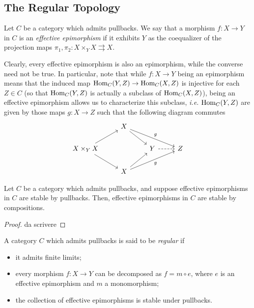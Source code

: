 \subsection{The Regular Topology}
\begin{defi}
	Let $C$ be a category which admits pullbacks. We say that a morphism $f:X\to Y$ in $C$ is an \textit{effective epimorphism} if it exhibits $Y$ as the coequalizer of the projection maps $\pi_1,\pi_2:X\times_Y X\rightrightarrows X$.
\end{defi}
\begin{rem}
	Clearly, every effective epimorphism is also an epimorphism, while the converse need not be true. In particular, note that while $f:X\to Y$ being an epimorphism means that the induced map $\mbox{Hom}_C(Y,Z)\to \mbox{Hom}_C(X,Z)$ is injective for each $Z\in C$ (so that $\mbox{Hom}_C(Y,Z)$ is actually a subclass of $\mbox{Hom}_C(X,Z)$), being an effective epimorphism allows us to characterize this subclass, \textit{i.e.} $\mbox{Hom}_C(Y,Z)$ are given by those maps $g:X\to Z$ such that the following diagram commutes
	\begin{equation*}
		\begin{tikzcd}
			& X \arrow[rd] \arrow[rrd, "g"]  &                     &   \\
			X\times_Y X \arrow[rd] \arrow[ru] &                                & Y \arrow[r, dashed] & Z \\
			& X \arrow[ru] \arrow[rru, "g"'] &                     &  
		\end{tikzcd}
	\end{equation*}
\end{rem}
\begin{lem}\label{Lemma:effectiveEpiComp}
	Let $C$ be a category which admits pullbacks, and suppose effective epimorphisms in $C$ are stable by pullbacks. Then, effective epimorphisms in $C$ are stable by compositions.
\end{lem}
\begin{proof}
	da scrivere
\end{proof}
\begin{defi}
	A category $C$ which admits pullbacks is said to be \textit{regular} if 
	\begin{itemize}[nosep]
		\item[(a)] it admits finite limits;
		\item[(b)] every morphism $f:X\to Y$ can be decomposed as $f=m\circ e$, where $e$ is an effective epimorphism and $m$ a monomorphism;
		\item[(c)] the collection of effective epimorphisms is stable under pullbacks.
	\end{itemize}
\end{defi}

